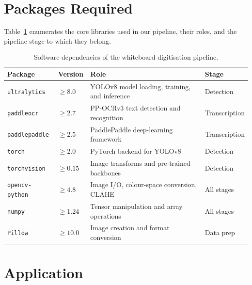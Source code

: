 \documentclass[11pt, a4paper]{article}
\begin{document}
\section{Packages Required}\label{sec:packages}

Table~\ref{tab:packages} enumerates the core libraries used in our pipeline, their roles, and the pipeline stage to which they belong.

\begin{table}[H]
\centering
\caption{Software dependencies of the whiteboard digitisation pipeline.}
\label{tab:packages}
\begin{tabular}{@{}llll@{}}
\toprule
\textbf{Package} & \textbf{Version} & \textbf{Role} & \textbf{Stage} \\
\midrule
\texttt{ultralytics}  & $\geq 8.0$  & YOLOv8 model loading, training, and inference & Detection \\
\texttt{paddleocr}     & $\geq 2.7$  & PP-OCRv3 text detection and recognition       & Transcription \\
\texttt{paddlepaddle}  & $\geq 2.5$  & PaddlePaddle deep-learning framework           & Transcription \\
\texttt{torch}         & $\geq 2.0$  & PyTorch backend for YOLOv8                    & Detection \\
\texttt{torchvision}   & $\geq 0.15$ & Image transforms and pre-trained backbones     & Detection \\
\texttt{opencv-python} & $\geq 4.8$  & Image I/O, colour-space conversion, CLAHE      & All stages \\
\texttt{numpy}         & $\geq 1.24$ & Tensor manipulation and array operations       & All stages \\
\texttt{Pillow}        & $\geq 10.0$ & Image creation and format conversion           & Data prep \\
\bottomrule
\end{tabular}
\end{table}


\section{Application}\label{sec:application}
\end{document}
